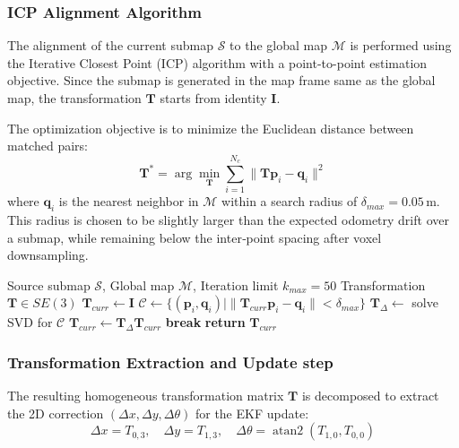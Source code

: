 \documentclass[11pt]{article}
\begin{document}
\subsubsection{ICP Alignment Algorithm}
The alignment of the current submap $\mathcal{S}$ to the global map $\mathcal{M}$ is performed using the Iterative Closest Point (ICP) algorithm with a point-to-point estimation objective. Since the submap is generated in the map frame same as the global map, the transformation $\mathbf{T}$ starts from identity $\mathbf{I}$.

The optimization objective is to minimize the Euclidean distance between matched pairs:
\begin{equation}
	\mathbf{T}^* = \arg\min_{\mathbf{T}} \sum_{i=1}^{N_c} \| \mathbf{T}\mathbf{p}_i - \mathbf{q}_i \|^2
\end{equation}
where $\mathbf{q}_i$ is the nearest neighbor in $\mathcal{M}$ within a search radius of $\delta_{max} = 0.05\,\text{m}$.  This radius is chosen to be slightly larger than the expected odometry drift over a submap, while remaining below the inter‑point spacing after voxel downsampling.

\begin{algorithm}
	\caption{Submap-to-Map ICP Registration}
	\label{alg:icp_alignment}
	\begin{algorithmic}[1]
		\Require Source submap $\mathcal{S}$, Global map $\mathcal{M}$, Iteration limit $k_{max}=50$
		\Ensure Transformation $\mathbf{T} \in SE(3)$
		\State $\mathbf{T}_{curr} \gets \mathbf{I}$
		\State $\mathcal{C} \gets \{ (\mathbf{p}_i, \mathbf{q}_i) \mid \|\mathbf{T}_{curr}\mathbf{p}_i - \mathbf{q}_i \| < \delta_{max} \}$ 
		\State $\mathbf{T}_{\Delta} \gets$ solve SVD for $\mathcal{C}$ 
		\State $\mathbf{T}_{curr} \gets \mathbf{T}_{\Delta} \mathbf{T}_{curr}$
		 
		\State \textbf{break}
		\EndIf
		\EndFor
		\State \textbf{return} $\mathbf{T}_{curr}$
	\end{algorithmic}
\end{algorithm}

\subsubsection{Transformation Extraction and Update step}
The resulting homogeneous transformation matrix $\mathbf{T}$ is decomposed to extract the 2D correction $(\Delta x, \Delta y, \Delta \theta)$ for the EKF update:
\begin{equation}
	\Delta x = T_{0,3}, \quad \Delta y = T_{1,3}, \quad \Delta \theta = \operatorname{atan2}(T_{1,0}, T_{0,0})
\end{equation}
 
\end{document}
